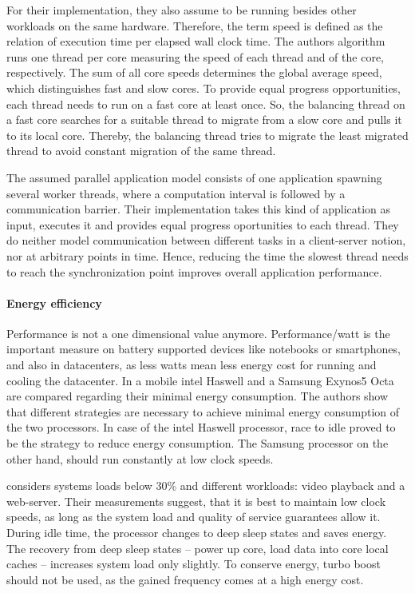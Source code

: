 For their implementation, they also assume to be running besides other
workloads on the same hardware.
Therefore, the term speed is defined as the relation of execution time per
elapsed wall clock time.
The authors algorithm runs one thread per core measuring the speed of each
thread and of the core, respectively.
The sum of all core speeds determines the global average speed, which
distinguishes fast and slow cores.
To provide equal progress opportunities, each thread needs to run on a fast
core at least once.
So, the balancing thread on a fast core searches for a suitable thread to
migrate from a slow core and pulls it to its local core.
Thereby, the balancing thread tries to migrate the least migrated thread to
avoid constant migration of the same thread.

The assumed parallel application model consists of one application
spawning several worker threads, where a computation interval is followed by a
communication barrier.
Their implementation takes this kind of application as input, executes it and
provides equal progress oportunities to each thread.
They do neither model communication between different tasks in a client-server
notion, nor at arbitrary points in time.
Hence, reducing the time the slowest thread needs to reach the synchronization
point improves overall application performance.
\\

\paragraph{Energy efficiency}
Performance is not a one dimensional value anymore.
Performance/watt is the important measure on battery supported devices like
notebooks or smartphones, and also in datacenters, as less watts mean less
energy cost for running and cooling the datacenter.
In \cite{imes_poet_2015} a mobile \gls{intel} Haswell and a Samsung Exynos5 Octa are
compared regarding their minimal energy consumption.
The authors show that different strategies are necessary to achieve minimal
energy consumption of the two processors.
In case of the \gls{intel} Haswell processor, race to idle proved to be the
strategy to reduce energy consumption.
The Samsung processor on the other hand, should run constantly at low clock
speeds.

\cite{le_sueur_slow_2011} considers systems loads below 30\% and different
workloads: video playback and a web-server.
Their measurements suggest, that it is best to maintain low clock speeds, as
long as the system load and quality of service guarantees allow it.
During idle time, the processor changes to deep sleep states and saves
energy.
The recovery from deep sleep states -- power up core, load data into core local
caches -- increases system load only slightly.
To conserve energy, turbo boost should not be used, as the gained frequency
comes at a high energy cost.

